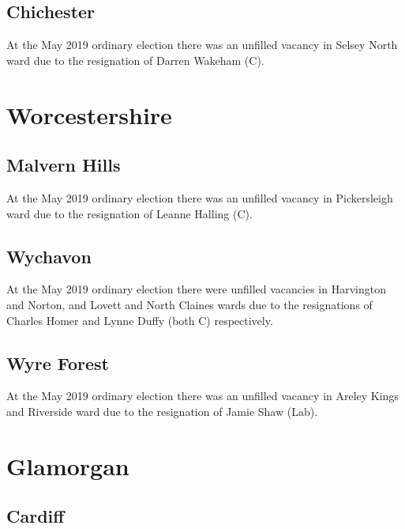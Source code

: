 \documentclass[a4paper,openany]{book}
\begin{document}
\begin{resultsiii}
\subsection*{Chichester}

At the May 2019 ordinary election there was an unfilled vacancy in Selsey North ward due to the resignation of Darren Wakeham (C).

\section{Worcestershire}

\subsection*{Malvern Hills}

At the May 2019 ordinary election there was an unfilled vacancy in Pickersleigh ward due to the resignation of Leanne Halling (C).

\subsection*{Wychavon}

At the May 2019 ordinary election there were unfilled vacancies in Harvington and Norton, and Lovett and North Claines wards due to the resignations of Charles Homer and Lynne Duffy (both C) respectively.

\subsection*{Wyre Forest}

At the May 2019 ordinary election there was an unfilled vacancy in Areley Kings and Riverside ward due to the resignation of Jamie Shaw (Lab).

\section{Glamorgan}

\subsection*{Cardiff}


\end{resultsiii}
\end{document}
